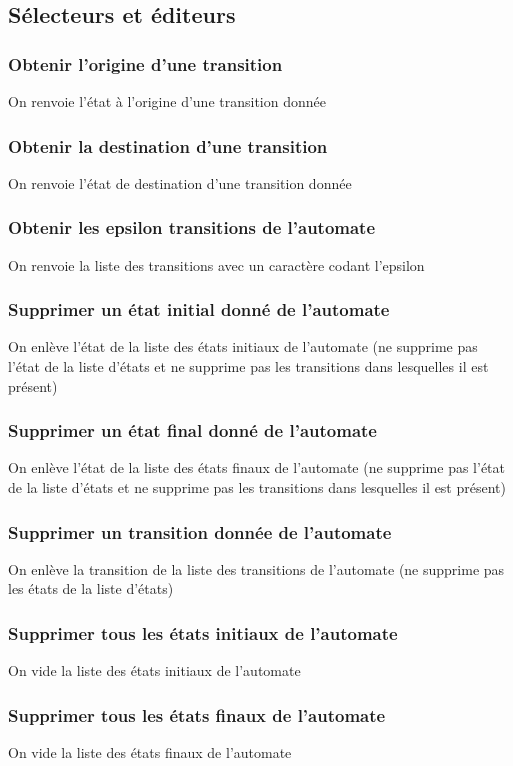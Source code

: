 \documentclass[a4paper, 12pt]{report}
\begin{document}
\subsection{Sélecteurs et éditeurs}
\subsubsection*{Obtenir l'origine d'une transition}
On renvoie l'état à l'origine d'une transition donnée
\subsubsection*{Obtenir la destination d'une transition}
On renvoie l'état de destination d'une transition donnée
\subsubsection*{Obtenir les epsilon transitions de l'automate}
On renvoie la liste des transitions avec un caractère codant l'epsilon
\subsubsection*{Supprimer un état initial donné de l'automate}
On enlève l'état de la liste des états initiaux de l'automate (ne supprime pas l'état de la liste d'états et ne supprime pas les transitions dans lesquelles il est présent)
\subsubsection*{Supprimer un état final donné de l'automate}
On enlève l'état de la liste des états finaux de l'automate (ne supprime pas l'état de la liste d'états et ne supprime pas les transitions dans lesquelles il est présent)
\subsubsection*{Supprimer un transition donnée de l'automate}
On enlève la transition de la liste des transitions de l'automate (ne supprime pas les états de la liste d'états)
\subsubsection*{Supprimer tous les états initiaux de l'automate}
On vide la liste des états initiaux de l'automate
\subsubsection*{Supprimer tous les états finaux de l'automate}
On vide la liste des états finaux de l'automate
\end{document}
